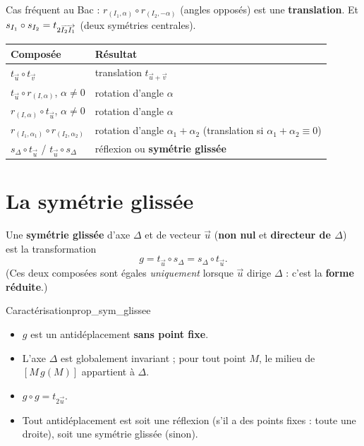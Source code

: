 \begin{astucebac}
	Cas fréquent au Bac : $r_{(I_1,\alpha)}\circ r_{(I_2,-\alpha)}$
	(angles opposés) est une \textbf{translation}. Et
	$s_{I_1}\circ s_{I_2} = t_{2\overrightarrow{I_2I_1}}$ (deux symétries centrales).
\end{astucebac}

\begin{center}
\renewcommand{\arraystretch}{1.35}
\begin{tabular}{>{\raggedright\arraybackslash}p{3.5cm}
                >{\raggedright\arraybackslash}p{4.6cm}}
\hline
\textbf{Composée} & \textbf{Résultat} \\
\hline
$t_{\vec u}\circ t_{\vec v}$ & translation $t_{\vec u+\vec v}$ \\
$t_{\vec u}\circ r_{(I,\alpha)}$, $\alpha\neq 0$ & rotation d'angle $\alpha$ \\
$r_{(I,\alpha)}\circ t_{\vec u}$, $\alpha\neq 0$ & rotation d'angle $\alpha$ \\
$r_{(I_1,\alpha_1)}\circ r_{(I_2,\alpha_2)}$ & rotation d'angle $\alpha_1+\alpha_2$
  \newline (translation si $\alpha_1+\alpha_2\equiv 0$) \\
$s_{\Delta}\circ t_{\vec u}$ / $t_{\vec u}\circ s_{\Delta}$ & réflexion ou
  \textbf{symétrie glissée} \\
\hline
\end{tabular}
\end{center}


\section{La symétrie glissée}

\begin{definition}
	Une \textbf{symétrie glissée} d'axe $\Delta$ et de vecteur $\vec u$
	(\textbf{non nul} et \textbf{directeur de $\Delta$}) est la transformation
	$$
	g = t_{\vec u}\circ s_{\Delta} = s_{\Delta}\circ t_{\vec u}.
	$$
	(Ces deux composées sont égales \emph{uniquement} lorsque $\vec u$ dirige
	$\Delta$ : c'est la \textbf{forme réduite}.)
\end{definition}

\begin{propriete}{Caractérisation}{prop_sym_glissee}
	\begin{itemize}[label=\textbullet]
		\item $g$ est un antidéplacement \textbf{sans point fixe}.
		\item L'axe $\Delta$ est globalement invariant ; pour tout point $M$, le
		milieu de $[M\,g(M)]$ appartient à $\Delta$.
		\item $g\circ g = t_{2\vec u}$.
		\item Tout antidéplacement est soit une réflexion (s'il a des points
		fixes : toute une droite), soit une symétrie glissée (sinon).
	\end{itemize}
\end{propriete}

